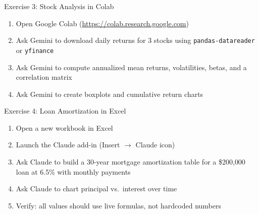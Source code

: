 \documentclass[aspectratio=169]{beamer}
\begin{document}
\begin{frame}{Exercise 3: Stock Analysis in Colab}
\begin{enumerate}
  \item Open Google Colab (\url{https://colab.research.google.com})
  \item Ask Gemini to download daily returns for 3 stocks using \texttt{pandas-datareader} or \texttt{yfinance}
  \item Ask Gemini to compute annualized mean returns, volatilities, betas, and a correlation matrix
  \item Ask Gemini to create boxplots and cumulative return charts
\end{enumerate}
\end{frame}

\begin{frame}{Exercise 4: Loan Amortization in Excel}
\begin{enumerate}
  \item Open a new workbook in Excel
  \item Launch the Claude add-in (Insert $\rightarrow$ Claude icon)
  \item Ask Claude to build a 30-year mortgage amortization table for a \$200{,}000 loan at 6.5\% with monthly payments
  \item Ask Claude to chart principal vs.\ interest over time
  \item Verify: \alert{all values should use live formulas, not hardcoded numbers}
\end{enumerate}
\end{frame}
\end{document}
